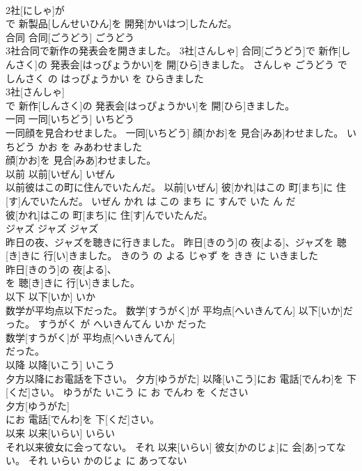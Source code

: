 \documentclass[8pt]{extreport}
\begin{document}
\begin{CJK}{UTF8}{min}
\\	2社[にしゃ]が
\\	で 新製品[しんせいひん]を 開発[かいはつ]したんだ。			
\\	合同	合同[ごうどう]	ごうどう	
\\	3社合同で新作の発表会を開きました。	3社[さんしゃ] 合同[ごうどう]で 新作[しんさく]の 発表会[はっぴょうかい]を 開[ひら]きました。	さんしゃ ごうどう で しんさく の はっぴょうかい を ひらきました	
\\	3社[さんしゃ]
\\	で 新作[しんさく]の 発表会[はっぴょうかい]を 開[ひら]きました。			
\\	一同	一同[いちどう]	いちどう	
\\	一同顔を見合わせました。	一同[いちどう] 顔[かお]を 見合[みあ]わせました。	いちどう かお を みあわせました	
\\	顔[かお]を 見合[みあ]わせました。			
\\	以前	以前[いぜん]	いぜん	
\\	以前彼はこの町に住んでいたんだ。	以前[いぜん] 彼[かれ]はこの 町[まち]に 住[す]んでいたんだ。	いぜん かれ は この まち に すんで いた ん だ	
\\	彼[かれ]はこの 町[まち]に 住[す]んでいたんだ。			
\\	ジャズ	ジャズ	ジャズ	
\\	昨日の夜、ジャズを聴きに行きました。	昨日[きのう]の 夜[よる]、ジャズを 聴[き]きに 行[い]きました。	きのう の よる じゃず を きき に いきました	
\\	昨日[きのう]の 夜[よる]、
\\	を 聴[き]きに 行[い]きました。			
\\	以下	以下[いか]	いか	
\\	数学が平均点以下だった。	数学[すうがく]が 平均点[へいきんてん] 以下[いか]だった。	すうがく が へいきんてん いか だった	
\\	数学[すうがく]が 平均点[へいきんてん]
\\	だった。			
\\	以降	以降[いこう]	いこう	
\\	夕方以降にお電話を下さい。	夕方[ゆうがた] 以降[いこう]にお 電話[でんわ]を 下[くだ]さい。	ゆうがた いこう に お でんわ を ください	
\\	夕方[ゆうがた]
\\	にお 電話[でんわ]を 下[くだ]さい。			
\\	以来	以来[いらい]	いらい	
\\	それ以来彼女に会ってない。	それ 以来[いらい] 彼女[かのじょ]に 会[あ]ってない。	それ いらい かのじょ に あってない	

\end{CJK}
\end{document}
